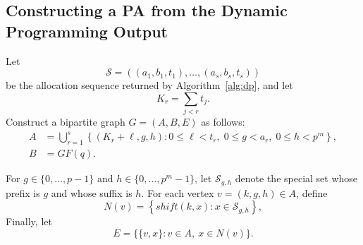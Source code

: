 \subsection{Constructing a PA from the Dynamic Programming Output}

\noindent
Let
\[
\mathcal S=((a_1,b_1,t_1),\ldots,(a_s,b_s,t_s))
\]
be the allocation sequence returned by Algorithm~\ref{alg:dp}, and let
\[
K_r=\sum_{j<r} t_j.
\]
Construct a bipartite graph $G=(A,B,E)$ as follows:
\[
\begin{aligned}
A
  &= \bigcup_{r=1}^{s}
     \left\{
       (K_r+\ell,g,h):
       0\le \ell<t_r,\;
       0\le g<a_r,\;
       0\le h<p^m
     \right\},\\
B
  &= GF(q).
\end{aligned}
\]

For $g\in\{0,\ldots,p-1\}$ and
$h\in\{0,\ldots,p^m-1\}$, let $\mathcal S_{g,h}$ denote
the special set whose prefix is $g$ and whose suffix is $h$.
For each vertex $v=(k,g,h)\in A$, define
\[
N(v)=
\left\{
shift(k,x):x\in\mathcal S_{g,h}
\right\},
\]
Finally, let
\[
E=\{\{v,x\}:v\in A,\ x\in N(v)\}.
\]
